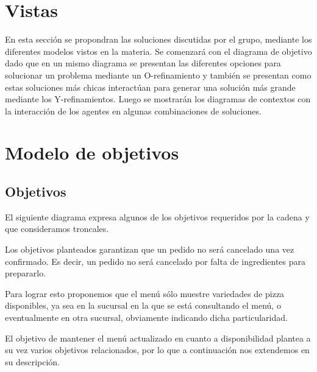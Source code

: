 \documentclass[a4paper,10pt]{article}
\begin{document}
\section*{Vistas}

En esta secci\'on se propondran las soluciones discutidas por el grupo, mediante los diferentes modelos vistos en la materia. Se comenzar\'a con
el diagrama de objetivo dado que en un mismo diagrama se presentan las diferentes opciones para solucionar un problema mediante un
O-refinamiento y tambi\'en se presentan como estas soluciones m\'as chicas interact\'uan para generar una soluci\'on m\'as grande mediante los 
Y-refinamientos. Luego se mostrar\'an los diagramas de contextos con la interacci\'on de los agentes en algunas combinaciones de soluciones.

\section*{Modelo de objetivos}


\subsection*{Objetivos}
\noindent

El siguiente diagrama expresa algunos de los objetivos requeridos por la cadena y que consideramos troncales.

\begin{figure}[H]
\centering
{}
\caption{}
\end{figure}

Los objetivos planteados garantizan que un pedido no será cancelado una vez confirmado. Es decir, un pedido no será cancelado por falta de ingredientes para prepararlo. 

Para lograr esto proponemos que el menú sólo muestre variedades de pizza disponibles, ya sea en la sucursal en la que se está consultando el menú, o eventualmente en otra sucursal, obviamente indicando dicha particularidad.

El objetivo de mantener el menú actualizado en cuanto a disponibilidad plantea a su vez varios objetivos relacionados, por lo que a continuación nos extendemos en su descripción.
\end{document}
